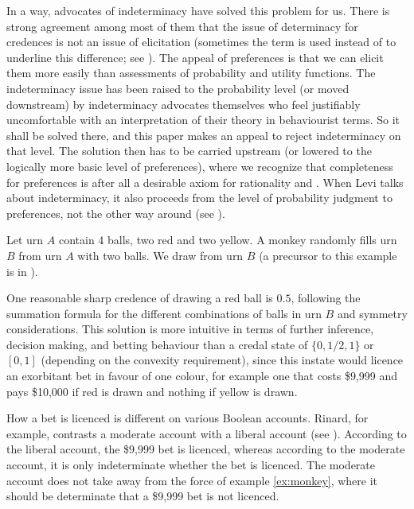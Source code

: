 \documentclass[11pt]{article}
\begin{document}
In a way, advocates of indeterminacy have solved this problem for us.
There is strong agreement among most of them that the issue of
determinacy for credences is not an issue of elicitation (sometimes
the term  is used instead of 
to underline this difference; see ). The appeal
of preferences is that we can elicit them more easily than assessments
of probability and utility functions. The indeterminacy issue has been
raised to the probability level (or moved downstream) by indeterminacy
advocates themselves who feel justifiably uncomfortable with an
interpretation of their theory in behaviourist terms. So it shall be
solved there, and this paper makes an appeal to reject indeterminacy
on that level. The solution then has to be carried upstream (or
lowered to the logically more basic level of preferences), where we
recognize that completeness for preferences is after all a desirable
axiom for rationality and  . When Levi talks
about indeterminacy, it also proceeds from the level of probability
judgment to preferences, not the other way around (see
).

\begin{quotex}
  \label{ex:monkey} Let urn $A$ contain 4
  balls, two red and two yellow. A monkey randomly fills urn $B$ from
  urn $A$ with two balls. We draw from urn $B$ (a precursor to this
  example is in ).
\end{quotex}

One reasonable sharp credence of drawing a red ball is $0.5$,
following the summation formula for the different combinations of
balls in urn $B$ and symmetry considerations. This solution is more
intuitive in terms of further inference, decision making, and betting
behaviour than a credal state of $\{0,1/2,1\}$ or $[0,1]$ (depending
on the convexity requirement), since this instate would licence an
exorbitant bet in favour of one colour, for example one that costs
\$9,999 and pays \$10,000 if red is drawn and nothing if yellow is
drawn.

How a bet is licenced is different on various Boolean accounts.
Rinard, for example, contrasts a moderate account with a liberal
account (see ). According to the liberal
account, the \$9,999 bet is licenced, whereas according to the
moderate account, it is only indeterminate whether the bet is
licenced. The moderate account does not take away from the force of
example \ref{ex:monkey}, where it should be determinate that a \$9,999
bet is not licenced.
\end{document}
